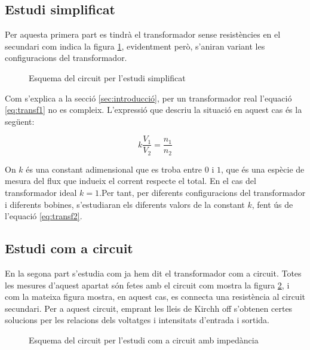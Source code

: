 \subsection{Estudi simplificat}
Per aquesta primera part es tindrà el transformador sense resistències en el secundari com indica la figura  \cref{fig:esq1}, evidentment però, s'aniran variant les configuracions del transformador.

\begin{figure}[htbp!]
    \centering \small \sffamily
    \caption{Esquema del circuit per l'estudi simplificat}
    \label{fig:esq1}
\end{figure}

Com s'explica a la secció \cref{sec:introducció}, per un transformador real l'equació \cref{eq:transf1} no es compleix. L'expressió que descriu la situació en aquest cas és la següent:

\begin{equation}\label{eq:transf2}
     k\frac{V_1}{V_2}=\frac{n_1}{n_2}
\end{equation}

On $k$ és una constant adimensional que es troba entre $0$ i $1$, que és una espècie de mesura del flux que indueix el corrent respecte el total. En el cas del transformador ideal $k=1$.Per tant, per diferents configuracions del transformador i diferents bobines, s'estudiaran els diferents valors de la constant $k$, fent ús de l'equació \cref{eq:transf2}.

\subsection{Estudi com a circuit}\label{sec:metcirc}

En la segona part s'estudia com ja hem dit el transformador com a circuit. Totes les mesures d'aquest apartat són fetes amb el circuit com mostra la figura \cref{fig:esq2}, i com la mateixa figura mostra, en aquest cas, es connecta una resistència al circuit secundari. Per a aquest circuit, emprant les lleis de Kirchh
off s'obtenen certes solucions per les relacions dels voltatges i intensitats d'entrada i sortida. 

\begin{figure}[htbp!]
    \centering \small \sffamily
    \caption{Esquema del circuit per l'estudi com a circuit amb impedància}
    \label{fig:esq2}
\end{figure}

